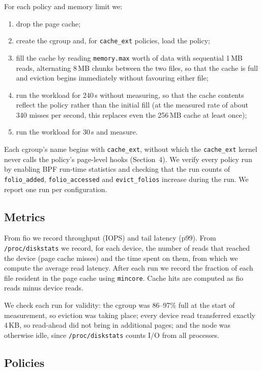 \documentclass[11pt,sigconf,nonacm]{acmart}
\newcommand{\cacheExt}{\texttt{cache\_ext}}
\begin{document}
For each policy and memory limit we:
\begin{enumerate}[leftmargin=1.5em, topsep=2pt, itemsep=1pt]
    \item drop the page cache;
    \item create the cgroup and, for \cacheExt{} policies, load the policy;
    \item fill the cache by reading \texttt{memory.max} worth of data with sequential 1\,MB reads, alternating 8\,MB chunks between the two files, so that the cache is full and eviction begins immediately without favouring either file;
    \item run the workload for 240\,s without measuring, so that the cache contents reflect the policy rather than the initial fill (at the measured rate of about 340 misses per second, this replaces even the 256\,MB cache at least once);
    \item run the workload for 30\,s and measure.
\end{enumerate}
Each cgroup's name begins with \texttt{cache\_ext}, without which the \cacheExt{} kernel never calls the policy's page-level hooks (Section~4). We verify every policy run by enabling BPF run-time statistics and checking that the run counts of \texttt{folio\_added}, \texttt{folio\_accessed} and \texttt{evict\_folios} increase during the run. We report one run per configuration. 

\subsection{Metrics}

From fio we record throughput (IOPS) and tail latency (p99). From \texttt{/proc/diskstats} we record, for each device, the number of reads that reached the device (page cache misses) and the time spent on them, from which we compute the average read latency. After each run we record the fraction of each file resident in the page cache using \texttt{mincore}. Cache hits are computed as fio reads minus device reads.

We check each run for validity: the cgroup was 86--97\% full at the start of measurement, so eviction was taking place; every device read transferred exactly 4\,KB, so read-ahead did not bring in additional pages; and the node was otherwise idle, since \texttt{/proc/diskstats} counts I/O from all processes.

\subsection{Policies}
\end{document}
